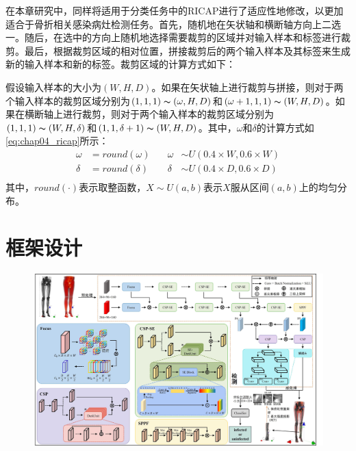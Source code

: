 在本章研究中，同样将适用于分类任务中的RICAP进行了适应性地修改，以更加适合于骨折相关感染病灶检测任务。首先，随机地在矢状轴和横断轴方向上二选一。随后，在选中的方向上随机地选择需要裁剪的区域并对输入样本和标签进行裁剪。最后，根据裁剪区域的相对位置，拼接裁剪后的两个输入样本及其标签来生成新的输入样本和新的标签。裁剪区域的计算方式如下：

假设输入样本的大小为\((W,H,D)\)。如果在矢状轴上进行裁剪与拼接，则对于两个输入样本的裁剪区域分别为\((1, 1, 1)\thicksim (\omega, H, D)\)和\((\omega + 1, 1, 1)\thicksim (W, H, D)\)。如果在横断轴上进行裁剪，则对于两个输入样本的裁剪区域分别为\((1, 1, 1)\thicksim (W, H, \delta)\)和\((1, 1, \delta + 1)\thicksim (W, H, D)\)。其中，\(\omega\)和\(\delta\)的计算方式如\ref{eq:chap04_ricap}所示：
\begin{equation}
  \begin{aligned}
    \omega & = round(\omega) & \quad \omega & \sim U(0.4\times W, 0.6 \times W) \\
    \delta & = round(\delta) & \quad \delta & \sim U(0.4\times D, 0.6 \times D) \\
  \end{aligned}
  \label{eq:chap04_ricap}
\end{equation}
其中，\(round(\cdot)\)表示取整函数，\(X \sim U(a, b)\)表示\(X\)服从区间\((a,b)\)上的均匀分布。

\section{框架设计}

\begin{figure}[htbp]
  \centering
  \includegraphics[width=0.9\textheight,height=\textwidth,angle=90,keepaspectratio]{figures/chap04_model.jpg}
  \label{fig:chap04_model}
\end{figure}

